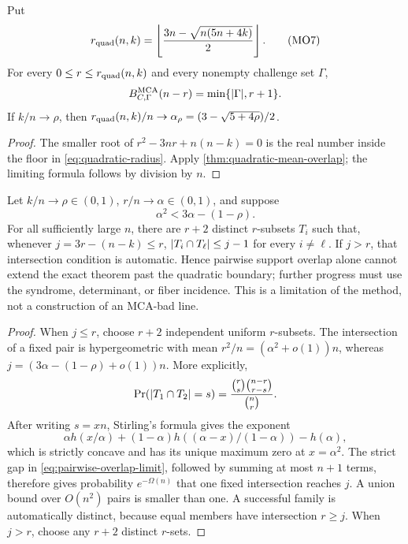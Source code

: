 \documentclass[11pt,a4paper]{amsart}
\numberwithin{equation}{section}
\theoremstyle{remark}
\begin{document}
\begin{corollary}
\label{cor:mean-overlap-exact}
Put
\[
 r_{\rm quad}(n,k)=
 \left\lfloor \frac{3n-\sqrt{n(5n+4k)}}2\right\rfloor.
 \tag{MO7}\label{eq:quadratic-radius}
\]
For every \(0\le r\le r_{\rm quad}(n,k)\) and every nonempty challenge
set \(\Gamma\),
\[
 B_{C,\Gamma}^{\rm MCA}(n-r)=\min\{\lvert \Gamma\rvert,r+1\}.
\]
If \(k/n\to\rho\), then
\(r_{\rm quad}(n,k)/n\to
\alpha_\rho=(3-\sqrt{5+4\rho})/2\).
\end{corollary}

\begin{proof}
The smaller root of \(r^2-3nr+n(n-k)=0\) is the real number inside the
floor in \eqref{eq:quadratic-radius}.  Apply
\cref{thm:quadratic-mean-overlap}; the limiting formula follows by
division by \(n\).
\end{proof}

\begin{proposition}
\label{prop:pairwise-overlap-limit}
Let \(k/n\to\rho\in(0,1)\), \(r/n\to\alpha\in(0,1)\), and suppose
\[
 \alpha^2<3\alpha-(1-\rho).
 \tag{MO8}\label{eq:pairwise-overlap-limit}
\]
For all sufficiently large \(n\), there are \(r+2\) distinct
\(r\)-subsets \(T_i\) such that, whenever
\(j=3r-(n-k)\le r\),
\(\lvert T_i\cap T_\ell\rvert\le j-1\) for every \(i\ne\ell\).  If \(j>r\),
that intersection condition is automatic.  Hence pairwise support overlap
alone cannot extend the exact theorem past the quadratic boundary; further
progress must use the syndrome, determinant, or fiber incidence.  This is
a limitation of the method, not a construction of an MCA-bad line.
\end{proposition}

\begin{proof}
When \(j\le r\), choose \(r+2\) independent uniform \(r\)-subsets.
The intersection of a fixed pair is hypergeometric with mean
\(r^2/n=(\alpha^2+o(1))n\), whereas
\(j=(3\alpha-(1-\rho)+o(1))n\).  More explicitly,
\[
 \Pr(\lvert T_1\cap T_2\rvert=s)
 =\frac{\binom rs\binom{n-r}{r-s}}{\binom nr}.
\]
After writing \(s=xn\), Stirling's formula gives the exponent
\[
 \alpha h(x/\alpha)+(1-\alpha)
 h((\alpha-x)/(1-\alpha))-h(\alpha),
\]
which is strictly concave and has its unique maximum zero at
\(x=\alpha^2\).  The strict gap in
\eqref{eq:pairwise-overlap-limit}, followed by summing at most \(n+1\)
terms, therefore gives probability \(e^{-\Omega(n)}\) that one fixed
intersection reaches \(j\).  A union bound over \(O(n^2)\) pairs is
smaller than one.  A
successful family is automatically distinct, because equal members have
intersection \(r\ge j\).  When \(j>r\), choose any \(r+2\) distinct
\(r\)-sets.
\end{proof}
\end{document}
